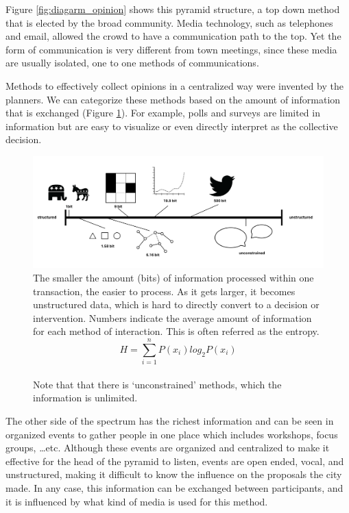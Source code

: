 Figure \ref{fig:diagarm_opinion} shows this pyramid structure, a top down method that is elected by the broad community. Media technology, such as telephones and email, allowed the crowd to have a communication path to the top. Yet the form of communication is very different from town meetings, since these media are usually isolated, one to one methods of communications.

Methods to effectively collect opinions in a centralized way 
were invented by the planners. We can categorize these methods based on the amount of information that is exchanged (Figure \ref{fig:spectrum}).  For example, polls and surveys are limited in information but are easy to visualize or even directly interpret as the collective decision.

\begin{figure}[!htb]
  \includegraphics[width=\textwidth]{chapters/2/fig/spectrum.png}               
  \caption[number of bits per transaction]{The smaller the amount (bits) of information processed within one transaction, the easier to process. As it gets larger, it becomes unstructured data, which is hard to directly convert to a decision or intervention. Numbers indicate the average amount of information for each method of interaction. This is often referred as the entropy.\cite{shannon1998mathematical}
  \[H = \sum_{i=1}^{n}P(x_i)log_2P(x_i) \] \\
  Note that that there is `unconstrained' methods, which the information is unlimited.}
  \label{fig:spectrum}
\end{figure}

The other side of the spectrum has the richest information and can be seen in organized events to gather people in one place which includes workshops, focus groups, \dots etc. Although these events are organized and centralized to make it effective for the head of the pyramid to listen, events are open ended, vocal, and unstructured, making it difficult to know the influence on the proposals the city made.  In any case, this information can be exchanged between participants, and it is influenced by what kind of media is used for this method.

